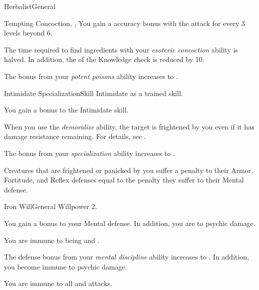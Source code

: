 \begin{feat}{Herbalist}{General}
\begin{magicalattuneability}{Tempting Concoction}{, , }
            \rankline
            You gain a  accuracy bonus with the attack for every 3 levels beyond 6.
        \end{magicalattuneability}

         The time required to find ingredients with your \textit{esoteric concoction} ability is halved.
        In addition, the  of the Knowledge check is reduced by 10.

         The bonus from your \textit{potent poisons} ability increases to .
    \end{feat}

    \begin{feat}{Intimidate Specialization}{Skill}
        \featpre Intimidate as a trained skill.

         You gain a  bonus to the Intimidate skill.

         When you use the \textit{demoralize} ability, the target is frightened by you even if it has damage resistance remaining.
        For details, see .

         The bonus from your \textit{specialization} ability increases to .

         Creatures that are frightened or panicked by you suffer a penalty to their Armor, Fortitude, and Reflex defenses equal to the penalty they suffer to their Mental defense.
    \end{feat}

    \begin{feat}{Iron Will}{General}
        \featpre Willpower 2.

         You gain a  bonus to your Mental defense.
        In addition, you are \impervious to psychic damage.

         You are immune to being \stunned and \confused.

         The defense bonus from your \textit{mental discipline} ability increases to .
        In addition, you become immune to psychic damage.

         You are immune to all  and  attacks.
    \end{feat}

